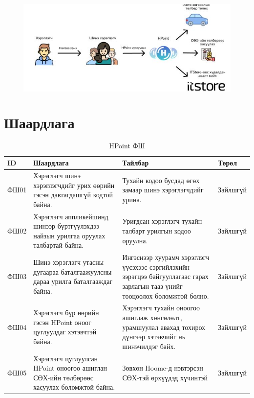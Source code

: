 \begin{figure}[h]
\centering
\includegraphics{imgs/hpointUseCase.JPG}
\end{figure}

\section{Шаардлага}
\begin{table}[h]
  \caption{HPoint ФШ}
  \begin{tabular}{|p{1cm}|p{6cm}|p{6cm}|l|}
    \hline
    ID & Шаардлага & Тайлбар & Төрөл \\ \hline
    ФШ01 & Хэрэглэгч шинэ хэрэглэгчдийг урих өөрийн гэсэн давтагдашгүй кодтой байна. & Тухайн кодоо бусдад өгөх замаар шинэ хэрэглэгчдийг урина. & Зайлшгүй \\ \hline
    ФШ02 & Хэрэглэгч аппликейшинд шинээр бүртгүүлэхдээ найзын урилгаа оруулах талбартай байна. & Уригдсан хэрэглэгч тухайн талбарт урилгын кодоо оруулна. & Зайлшгүй \\ \hline
    ФШ03 & Шинэ хэрэглэгч утасны дугаараа баталгаажуулсны дараа урилга баталгааждаг байна. &Ингэснээр хуурамч хэрэглэгч үүсэхээс сэргийлэхийн зэрэгцээ байгууллагаас гарах зарлагын тааз үнийг тооцоолох боломжтой болно. & Зайлшгүй \\ \hline
    ФШ04 & Хэрэглэгч бүр өөрийн гэсэн HPoint оноог цуглуулдаг хэтэвчтэй байна. & Хэрэглэгч тухайн оноогоо ашиглаж хөнгөлөлт, урамшуулал авахад тохирох дүнгээр хэтэвчийг нь шинэчилдэг байх. & Зайлшгүй \\ \hline
    ФШ05 & Хэрэглэгч цуглуулсан HPoint оноогоо ашиглан СӨХ-ийн төлбөрөөс хасуулах боломжтой байна. & Зөвхөн Hoome-д нэвтэрсэн СӨХ-тэй өрхүүдэд хүчинтэй & Зайлшгүй \\ \hline
  \end{tabular}
\end{table}

